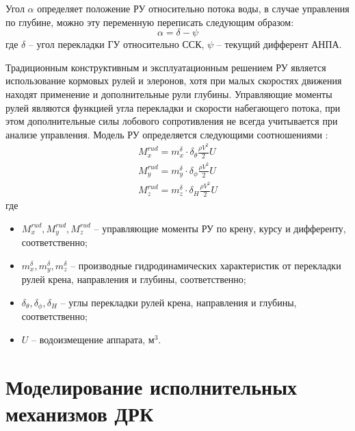 Угол $\alpha$ определяет положение РУ относительно потока воды, в случае управления по глубине, можно эту переменную переписать следующим образом:
\begin{equation*}
    \alpha = \delta - \psi
\end{equation*}
\noindent где $\delta$ -- угол перекладки ГУ относительно ССК, $\psi$ -- текущий дифферент АНПА.

Традиционным конструктивным и эксплуатационным решением РУ является использование кормовых рулей и элеронов, хотя при малых скоростях движения находят применение и дополнительные рули глубины.
Управляющие моменты рулей являются функцией угла перекладки и скорости набегающего потока, при этом дополнительные силы лобового сопротивления не всегда учитывается при анализе управления.
Модель РУ определяется следующими соотношениями \cite{боженов1986}:
\begin{equation}
	\label{eq:modelling-rudder}
	\begin{array}{ll}
    M_x^{rud} = m_x^{\delta} \cdot \delta_{\theta} \frac{\rho V^2}{2} U \\
    M_y^{rud} = m_y^{\delta} \cdot \delta_{\phi} \frac{\rho V^2}{2} U \\
    M_z^{rud} = m_z^{\delta} \cdot \delta_{H} \frac{\rho V^2}{2} U
    \end{array}
\end{equation}
\noindent где
\begin{itemize}
    \item $M_x^{rud}, M_y^{rud}, M_z^{rud}$ -- управляющие моменты РУ по крену, курсу и дифференту, соответственно;
    \item $m_x^{\delta}, m_y^{\delta}, m_z^{\delta}$ -- производные гидродинамических характеристик от перекладки рулей крена, направления и глубины, соответственно;
    \item $\delta_{\theta}, \delta_{\phi}, \delta_{H}$ -- углы перекладки рулей крена, направления и глубины, соответственно;
    \item $U$ -- водоизмещение аппарата, м$^3$.
\end{itemize}

\section{Моделирование исполнительных механизмов ДРК}
